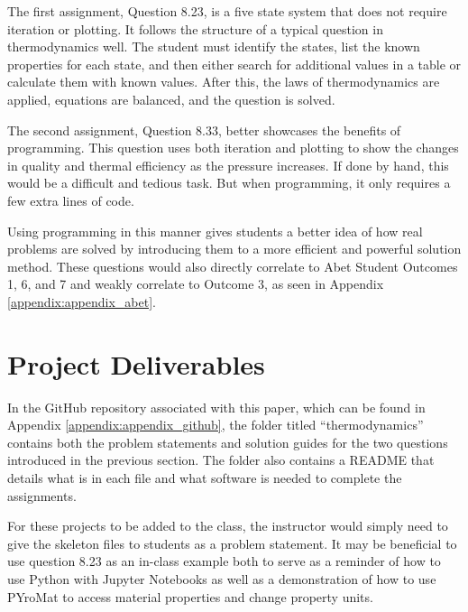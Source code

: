The first assignment, Question 8.23, is a five state system that does not require iteration or plotting. It 
follows the structure of a typical question in thermodynamics well. The student must identify the states, list
the known properties for each state, and then either search for additional values in a table or calculate them 
with known values. After this, the laws of thermodynamics are applied, equations are balanced, and the question
is solved.

The second assignment, Question 8.33, better showcases the benefits of programming. This question uses both
iteration and plotting to show the changes in quality and thermal efficiency as the pressure increases. If 
done by hand, this would be a difficult and tedious task. But when programming, it only requires a few extra
lines of code.

Using programming in this manner gives students a better idea of how real problems are solved by introducing
them to a more efficient and powerful solution method. These questions would also directly correlate to Abet 
Student Outcomes 1, 6, and 7 and weakly correlate to Outcome 3, as seen in Appendix \ref{appendix:appendix_abet}.

\section{Project Deliverables}

In the GitHub repository associated with this paper, which can be found in Appendix \ref{appendix:appendix_github},
the folder titled ``thermodynamics'' contains both the problem statements and solution guides for the two questions
introduced in the previous section. The folder also contains a README that details what is in each file and 
what software is needed to complete the assignments. 

For these projects to be added to the class, the instructor would simply need to give the skeleton files to 
students as a problem statement. It may be beneficial to use question 8.23 as an in-class example both to serve 
as a reminder of how to use Python with Jupyter Notebooks as well as a demonstration of how to use PYroMat to 
access material properties and change property units.